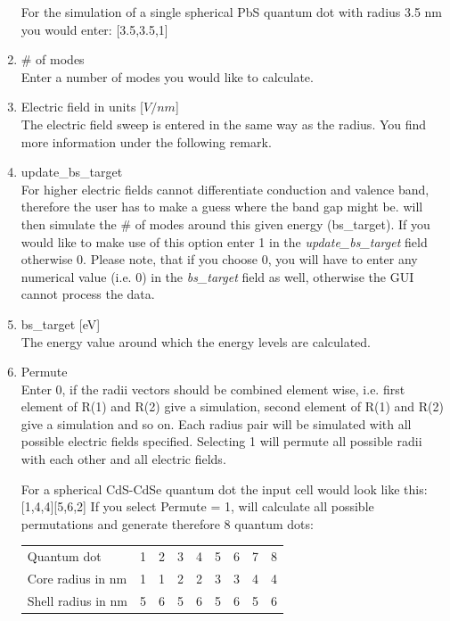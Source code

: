 \begin{enumerate}
							\begin{EXAMPLE}
								For the simulation of a single spherical PbS quantum dot with radius 3.5 nm you would enter: [3.5,3.5,1]
							\end{EXAMPLE}
				\item \# of modes	\\
							Enter a number of modes you would like to calculate.
				\item Electric field in units [$V/nm$]			\\
							The electric field sweep is entered in the same way as the radius. You find more information under the following remark.
				\item update\_bs\_target	\\
							For higher electric fields \omen cannot differentiate conduction and valence band, therefore the user has to make a guess
							where the band gap might be. \omen will then simulate the \# of modes around this given energy (bs\_target).
							If you would like to make use of this option enter 1 in the {\it update\_bs\_target} field otherwise 0.
							Please note, that if you choose 0, you will have to enter any numerical value (i.e. 0) in the {\it bs\_target} field as well, otherwise
							the \gls{GUI} cannot process the data.
				\item bs\_target [eV]	\\
							The energy value around which the energy levels are calculated.
				\item Permute	\\
							Enter 0, if the radii vectors should be combined element wise, i.e. first element of R(1) and R(2) give a simulation, second element
							of R(1) and R(2) give a simulation and so on. Each radius pair will be simulated with all possible electric fields specified.
							Selecting 1 will permute all possible radii with each other and all electric fields.
							\begin{EXAMPLE}
								For a spherical CdS-CdSe quantum dot the input cell would look like this: [1,4,4][5,6,2]
								 If you select Permute = 1, \software will calculate all possible permutations and generate therefore 8 quantum dots: \\
								\newline
								\begin{tabular}{@{}lcccccccc}
									Quantum dot					&	1	&	2	&	3	&	4 &	5	&	6	& 7	&	8	\\
									Core radius	in nm		&	1	& 1 & 2 & 2 & 3	& 3 & 4 & 4	\\
									Shell radius in nm	& 5	& 6 & 5 & 6 & 5 & 6 & 5 & 6	\\
								\end{tabular}
							\end{EXAMPLE}
							

\end{enumerate}
